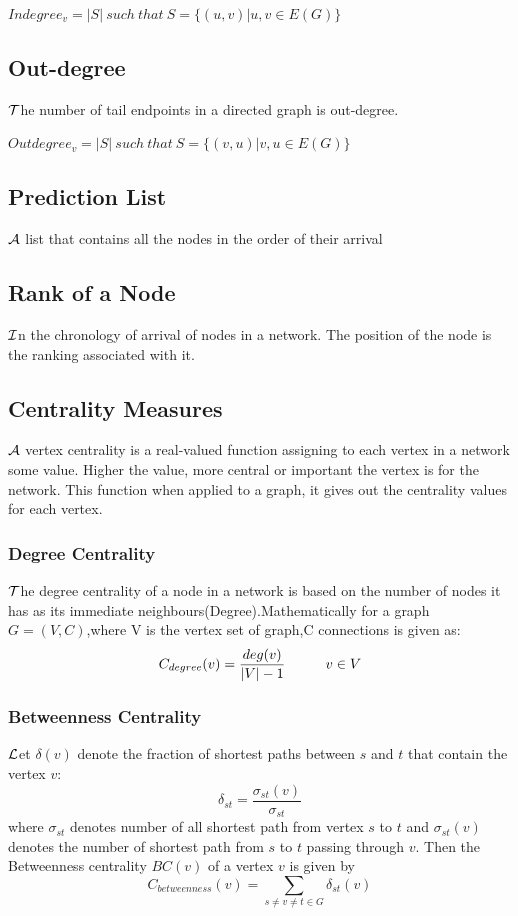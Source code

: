 \documentclass{article}
\begin{document}
$Indegree_v = |S|\ such\ that\ S = \{(u,v)|u,v \in E(G)\}$

\subsection{Out-degree}
\hspace{.18in} $\cal T$he number of tail endpoints in a directed graph is out-degree.

$Outdegree_v = |S|\ such\ that\ S = \{(v,u)|v,u \in E(G)\}$

\subsection{Prediction List}
\hspace{.18in}$\cal A$ list that contains all the nodes in the order of their arrival   
\subsection{Rank of a Node}
\hspace{.18in}$\cal I$n the chronology of arrival of nodes in a network. The position of the node is the ranking associated with it.  
\subsection{Centrality Measures}
\hspace{.18in} $\cal A$ vertex centrality is a real-valued function assigning to each vertex in a network some value. Higher the value, more central or important the vertex is for the  network. This function when applied to a graph, it gives out the centrality values for each vertex.
\subsubsection{Degree Centrality}
\hspace{.18in} $\cal T$he degree centrality of a node in a network is based on the number of nodes it has as its immediate neighbours(Degree).Mathematically for a graph $G = (V,C)$,where V is the vertex set of graph,C connections is given as:
\begin{equation}
C_{degree}(v) = \frac{deg(v)}{|V|-1}
\hspace{.4in} v \in V
\end{equation} 
\subsubsection{Betweenness Centrality}
\hspace{.18in} $\cal L$et \rm$\delta(v)$ denote the fraction of shortest paths between $s$ and $t$ that contain the vertex $v$:
\begin{equation}
\delta_{st} = \frac{\sigma_{st}(v)}{\sigma_{st}} 
\end{equation}
where $\sigma_{st}$ denotes number of all shortest path from vertex $s$ to $t$ and $\sigma_{st}(v)$ denotes the number of shortest path from $s$ to $t$ passing through $v$. Then the Betweenness centrality $BC(v)$ of a vertex $v$ is given by 
\begin{equation}
C_{betweenness}(v) = \sum_{s\neq v \neq t \in G} \delta_{st}(v)
\end{equation}
\end{document}
